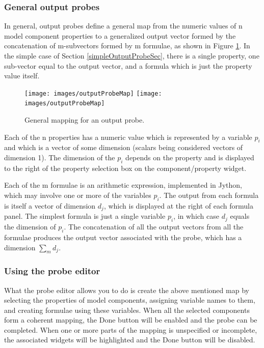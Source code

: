 \documentclass{article}
\begin{document}
\subsubsection{General output probes}

In general, output probes define a general map from the numeric values
of n model component properties to a generalized output vector formed by the
concatenation of m-subvectors formed by m formulae, as shown
in Figure \ref{OutputProbeMapFig}. In the simple case of 
Section \ref{simpleOutputProbeSec},
there is a single property, one sub-vector equal to the output
vector, and a formula which is just the property value itself.

\begin{figure}
\begin{center}
\iflatexml
\texttt{[image: images/outputProbeMap]}
\else
\texttt{[image: images/outputProbeMap]}
\fi
\end{center}
\caption{General mapping for an output probe.}%
\label{OutputProbeMapFig}
\end{figure}

Each of the n properties has a numeric value which is
represented by a variable $p_i$ and which is a vector of some dimension
(scalars being considered vectors of dimension 1). The dimension of
the $p_i$ depends on the property and is displayed to the right of the
property selection box on the component/property widget.

Each of the m formulae is an arithmetic expression, implemented in
Jython, which may involve one or more of the variables $p_i$. The output
from each formula is itself a vector of dimension $d_j$, which is
displayed at the right of each formula panel. The simplest formula is
just a single variable $p_i$, in which case $d_j$ equals the dimension of
$p_i$. The concatenation of all the output vectors from all the formulae
produces the output vector associated with the probe, which has a
dimension $\sum_m d_j$.

\subsubsection{Using the probe editor}

What the probe editor allows you to do is create the above mentioned
map by selecting the properties of model components, assigning
variable names to them, and creating formulae using these
variables. When all the selected components form a coherent mapping,
the {\sf Done} button will be enabled and the probe can be completed. When
one or more parts of the mapping is unspecified or incomplete, the
associated widgets will be highlighted and the {\sf Done} button will be
disabled.
\end{document}
